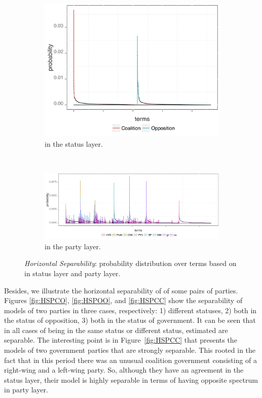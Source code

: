 \begin{figure}[t]
    \centering
    \begin{subfigure}[b]{0.32\textwidth}
\includegraphics[width=\linewidth]{02-part-01/chapter-03/figs_and_tables/img_opo-coa.png}
\caption{\label{fig:HSS}\achswlm in the status layer.}
        \end{subfigure}
        ~ 
    \begin{subfigure}[b]{0.64\textwidth}
\includegraphics[width=\linewidth]{02-part-01/chapter-03/figs_and_tables/img_parties.png}
\caption{\label{fig:HSP}\achswlm in the party layer.}
        \end{subfigure}
    \caption{\label{fig:HS} \emph{Horizontal Separability}: probability distribution over terms based on \hswlms in status layer and party layer.}
\end{figure}

Besides, we illustrate the horizontal separability of \achswlm of some pairs of parties. Figures \ref{fig:HSPCO}, \ref{fig:HSPOO}, and \ref{fig:HSPCC} show the separability of models of two parties in three cases, respectively: 1) different statuses, 2) both in the status of opposition, 3) both in the status of government. It can be seen that in all cases of being in the same status or different status, estimated \hswlms are separable. The interesting point is in Figure~\ref{fig:HSPCC} that presents the models of two government parties that are strongly separable. This rooted in the fact that in this period there was an unusual coalition government consisting of a right-wing and a left-wing party. So, although they have an agreement in the status layer, their model is highly separable in terms of having opposite spectrum in party layer.


